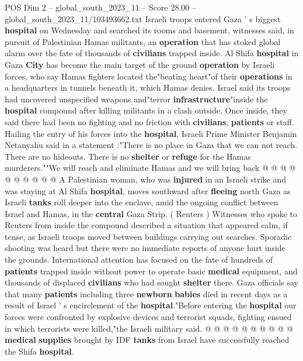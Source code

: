 \begin{textsample}{POS Dim 2 – global\_south\_2023\_11 – Score 28.00 – global\_south\_2023\_11/103493662.txt}  \label{ex:f2_pos_098}
Israeli troops entered Gaza ' s biggest \textbf{hospital} on Wednesday and searched its rooms and basement, witnesses said, in pursuit of Palestinian Hamas militants, an \textbf{operation} that has stoked global alarm over the fate of thousands of \textbf{civilians} trapped inside.
Al Shifa \textbf{hospital} in Gaza \textbf{City} has become the main target of the ground \textbf{operation} by Israeli forces, who say Hamas fighters located the"beating heart"of their \textbf{operations} in a headquarters in tunnels beneath it, which Hamas denies.
Israel said its troops had uncovered unspecified weapons and"terror \textbf{infrastructure}"inside the \textbf{hospital} compound after killing militants in a clash outside.
Once inside, they said there had been no fighting and no friction with \textbf{civilians}, \textbf{patients} or staff.
Hailing the entry of his forces into the \textbf{hospital}, Israeli Prime Minister Benjamin Netanyahu said in a statement :"There is no place in Gaza that we can not reach.
There are no hideouts.
There is no \textbf{shelter} or \textbf{refuge} for the Hamas murderers.""We will reach and eliminate Hamas and we will bring back @ @ @ @ @ @ @ @ @ @ A Palestinian woman, who was \textbf{injured} in an Israeli strike and was staying at Al Shifa \textbf{hospital}, moves southward after \textbf{fleeing} north Gaza as Israeli \textbf{tanks} roll deeper into the enclave, amid the ongoing conflict between Israel and Hamas, in the \textbf{central} Gaza Strip. ( Reuters ) Witnesses who spoke to Reuters from inside the compound described a situation that appeared calm, if tense, as Israeli troops moved between buildings carrying out searches.
Sporadic shooting was heard but there were no immediate reports of anyone hurt inside the grounds.
International attention has focused on the fate of hundreds of \textbf{patients} trapped inside without power to operate basic \textbf{medical} equipment, and thousands of displaced \textbf{civilians} who had sought \textbf{shelter} there.
Gaza officials say that many \textbf{patients} including three \textbf{newborn} \textbf{babies} died in recent days as a result of Israel ' s encirclement of the \textbf{hospital}."Before entering the \textbf{hospital} our forces were confronted by explosive devices and terrorist squads, fighting ensued in which terrorists were killed,"the Israeli military said. @ @ @ @ @ @ @ @ @ @ \textbf{medical} \textbf{supplies} brought by IDF \textbf{tanks} from Israel have successfully reached the Shifa \textbf{hospital}.

\end{textsample}
